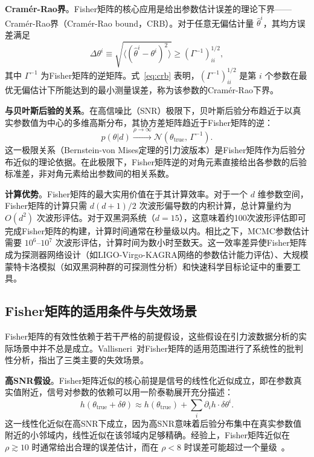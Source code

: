 \textbf{Cramér-Rao界}。Fisher矩阵的核心应用是给出参数估计误差的理论下界——Cramér-Rao界（Cramér-Rao bound，CRB）。对于任意无偏估计量 $\hat{\theta}^i$，其均方误差满足
\begin{equation}
  \Delta\theta^i \equiv \sqrt{\langle(\hat{\theta}^i - \theta^i)^2\rangle} \geq \left(\Gamma^{-1}\right)_{ii}^{1/2},
  \label{eq:crb}
\end{equation}
其中 $\Gamma^{-1}$ 为Fisher矩阵的逆矩阵。式~\eqref{eq:crb} 表明，$(\Gamma^{-1})_{ii}^{1/2}$ 是第 $i$ 个参数在最优无偏估计下所能达到的最小测量误差，称为该参数的Cramér-Rao下界。

\textbf{与贝叶斯后验的关系}。在高信噪比（SNR）极限下，贝叶斯后验分布趋近于以真实参数值为中心的多维高斯分布，其协方差矩阵趋近于Fisher矩阵的逆：
\begin{equation}
  p(\theta | d) \xrightarrow{\rho \to \infty} \mathcal{N}\!\left(\theta_\mathrm{true},\, \Gamma^{-1}\right).
  \label{eq:fisher_gaussian}
\end{equation}
这一极限关系（Bernstein-von Mises定理的引力波版本）是Fisher矩阵作为后验分布近似的理论依据。在此极限下，Fisher矩阵逆的对角元素直接给出各参数的后验标准差，非对角元素给出参数间的相关系数。

\textbf{计算优势}。Fisher矩阵的最大实用价值在于其计算效率。对于一个 $d$ 维参数空间，Fisher矩阵的计算只需 $d(d+1)/2$ 次波形偏导数的内积计算，总计算量约为 $O(d^2)$ 次波形评估。对于双黑洞系统（$d = 15$），这意味着约100次波形评估即可完成Fisher矩阵的构建，计算时间通常在秒量级以内。相比之下，MCMC参数估计需要 $10^6$--$10^7$ 次波形评估，计算时间为数小时至数天。这一效率差异使Fisher矩阵成为探测器网络设计（如LIGO-Virgo-KAGRA网络的参数估计能力评估）、大规模蒙特卡洛模拟（如双黑洞种群的可探测性分析）和快速科学目标论证中的重要工具。

\subsection{Fisher矩阵的适用条件与失效场景}

Fisher矩阵的有效性依赖于若干严格的前提假设，这些假设在引力波数据分析的实际场景中并不总是成立。Vallisneri~\cite{Vallisneri2008Fisher}对Fisher矩阵的适用范围进行了系统性的批判性分析，指出了三类主要的失效场景。

\textbf{高SNR假设}。Fisher矩阵近似的核心前提是信号的线性化近似成立，即在参数真实值附近，信号对参数的依赖可以用一阶泰勒展开充分描述：
\begin{equation}
  h(\theta_\mathrm{true} + \delta\theta) \approx h(\theta_\mathrm{true}) + \sum_i \partial_i h \cdot \delta\theta^i.
\end{equation}
这一线性化近似在高SNR下成立，因为高SNR意味着后验分布集中在真实参数值附近的小邻域内，线性近似在该邻域内足够精确。经验上，Fisher矩阵近似在 $\rho \gtrsim 10$ 时通常给出合理的误差估计，而在 $\rho < 8$ 时误差可能超过一个量级~\cite{Rodriguez2013Fisher}。

